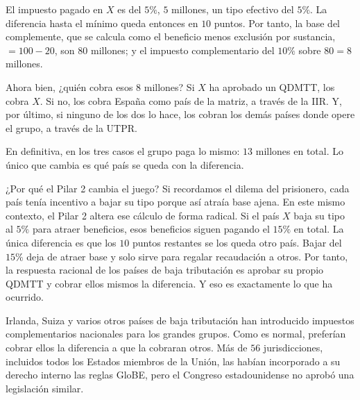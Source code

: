 \documentclass[10pt,a4paper]{article}
\begin{document}
El impuesto pagado en $X$ es del $5\%$, $5$ millones, un tipo efectivo del $5\%$. La diferencia hasta el mínimo queda entonces en $10$ puntos. Por tanto, la base del complemente, que se calcula como el beneficio menos exclusión por sustancia, $= 100 - 20$, son $80$ millones; y el impuesto complementario del $10\%$ sobre $80 = 8$ millones.

Ahora bien, ¿quién cobra esos $8$ millones? Si $X$ ha aprobado un QDMTT, los cobra $X$. Si no, los cobra España como país de la matriz, a través de la IIR. Y, por último, si ninguno de los dos lo hace, los cobran los demás países donde opere el grupo, a través de la UTPR.

En definitiva, en los tres casos el grupo paga lo mismo: $13$ millones en total. Lo único que cambia es qué país se queda con la diferencia.

¿Por qué el Pilar 2 cambia el juego? Si recordamos el dilema del prisionero, cada país tenía incentivo a bajar su tipo porque así atraía base ajena. En este mismo contexto, el Pilar 2 altera ese cálculo de forma radical. Si el país $X$ baja su tipo al $5\%$ para atraer beneficios, esos beneficios siguen pagando el $15\%$ en total. La única diferencia es que los $10$ puntos restantes se los queda otro país. Bajar del $15\%$ deja de atraer base y solo sirve para regalar recaudación a otros. Por tanto, la respuesta racional de los países de baja tributación es aprobar su propio QDMTT y cobrar ellos mismos la diferencia. Y eso es exactamente lo que ha ocurrido. 

Irlanda, Suiza y varios otros países de baja tributación han introducido impuestos complementarios nacionales para los grandes grupos. Como es normal, preferían cobrar ellos la diferencia a que la cobraran otros. Más de $56$ jurisdicciones, incluidos todos los Estados miembros de la Unión, las habían incorporado a su derecho interno las reglas GloBE, pero el Congreso estadounidense no aprobó una legislación similar.
\end{document}
